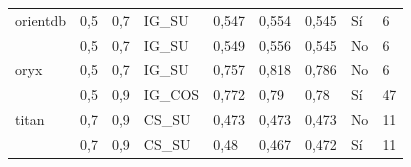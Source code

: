 \begin{table}[H]
{{\begin{tabular}{lllllllll}
orientdb                             & 0,5                               & 0,7                            & IG\_SU                                      & 0,547                                  & 0,554                               & 0,545                                 & Sí                               & 6                                         \\
                             & 0,5                               & 0,7                            & IG\_SU                                      & 0,549                                  & 0,556                               & 0,545                                 & No                                   & 6                                         \\
oryx                                 & 0,5                               & 0,7                            & IG\_SU                                      & 0,757                                  & 0,818                               & 0,786                                 & No                                   & 6                                         \\
                                 & 0,5                               & 0,9                            & IG\_COS                                     & 0,772                                  & 0,79                                & 0,78                                  & Sí                               & 47                                        \\
titan                                & 0,7                               & 0,9                            & CS\_SU                                      & 0,473                                  & 0,473                               & 0,473                                 & No                                   & 11                                        \\
                                & 0,7                               & 0,9                            & CS\_SU                                      & 0,48                                   & 0,467                               & 0,472                                 & Sí                               & 11        \\
                                \bottomrule
\end{tabular}%
}}


\end{table}